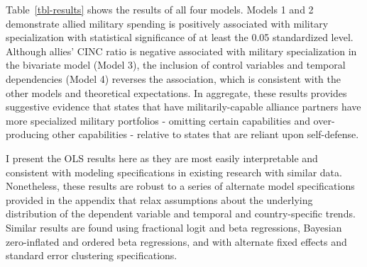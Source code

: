 \documentclass[
  12,
  letterpaper,
  DIV=11,
  numbers=noendperiod]{scrartcl}
\begin{document}
Table~\ref{tbl-results} shows the results of all four models. Models 1
and 2 demonstrate allied military spending is positively associated with
military specialization with statistical significance of at least the
0.05 standardized level. Although allies' CINC ratio is negative
associated with military specialization in the bivariate model (Model
3), the inclusion of control variables and temporal dependencies (Model
4) reverses the association, which is consistent with the other models
and theoretical expectations. In aggregate, these results provides
suggestive evidence that states that have militarily-capable alliance
partners have more specialized military portfolios - omitting certain
capabilities and over-producing other capabilities - relative to states
that are reliant upon self-defense.

I present the OLS results here as they are most easily interpretable and
consistent with modeling specifications in existing research with
similar data. Nonetheless, these results are robust to a series of
alternate model specifications provided in the appendix that relax
assumptions about the underlying distribution of the dependent variable
and temporal and country-specific trends. Similar results are found
using fractional logit and beta regressions, Bayesian zero-inflated and
ordered beta regressions, and with alternate fixed effects and standard
error clustering specifications.
\end{document}

